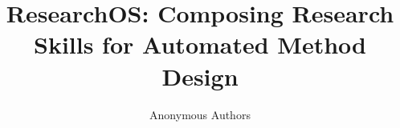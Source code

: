 \documentclass{article}
\title{ResearchOS: Composing Research Skills for Automated Method Design}
\author{%
  Anonymous Authors
}
\begin{document}
\maketitle

\begin{abstract}

\end{abstract}








\clearpage



\appendix

\end{document}
